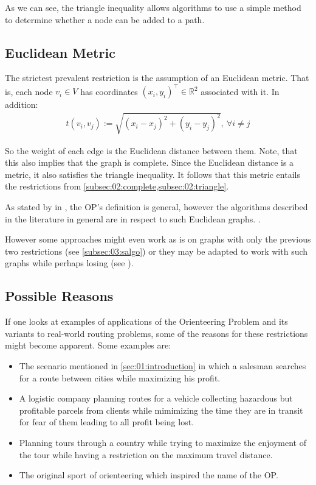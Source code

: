 As we can see, the triangle inequality allows algorithms to use a simple method to determine whether a node can be added to a path.

\subsection{Euclidean Metric}
\label{subsec:02:euclidean}

The strictest prevalent restriction is the assumption of an Euclidean metric. 
That is, each node $v_i \in V$ has coordinates $(x_i, y_i)^\intercal \in \mathbb{R}^2$ associated with it.
In addition: 
\begin{align*}
  t(v_i,v_j) := \sqrt{(x_i - x_j)^2 + (y_i - y_j)^2},\ \forall i \neq j
\end{align*}

So the weight of each edge is the Euclidean distance between them. Note, that this also implies that the graph is complete.
Since the Euclidean distance is a metric, it also satisfies the triangle inequality.
It follows that this metric entails the restrictions from \cref{subsec:02:complete,subsec:02:triangle}.

As stated by \citeauthor{vansteenwegen_orienteering_2011} in \cite{vansteenwegen_orienteering_2011}, the OP's definition is general, however the algorithms described in the literature in general are in respect to such Euclidean graphs. \cite{golden_orienteering_1987,tsiligiridis_heuristic_1984,szwarc_novel_2022,geem_harmony_2005}.

However some approaches might even work as is on graphs with only the previous two restrictions (see \cref{subsec:03:salgo}) or they may be adapted to work with such graphs while perhaps losing  (see ). 

\subsection{Possible Reasons}

If one looks at examples of applications of the Orienteering Problem and its variants to real-world routing problems, some of the reasons for these restrictions might become apparent. Some examples are:
\begin{itemize}
  \item The scenario mentioned in \cref{sec:01:introduction} in which a salesman searches for a route between cities while maximizing his profit. \cite{chao_fast_1996}
  \item A logistic company planning routes for a vehicle collecting hazardous but profitable parcels from clients while mimimizing the time they are in transit for fear of them leading to all profit being lost. \cite{santini_hazardous_2022}    
  \item Planning tours through a country while trying to maximize the enjoyment of the tour while having a restriction on the maximum travel distance. \cite{geem_harmony_2005}
  \item The original sport of orienteering which inspired the name of the OP. \cite{tsiligiridis_heuristic_1984}  
\end{itemize}

